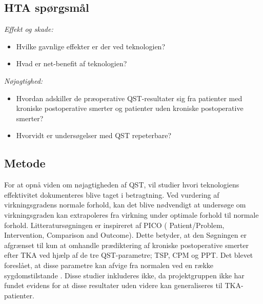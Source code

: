 \subsection{HTA spørgsmål}
\textit{Effekt og skade:}
\begin{itemize}
	\item Hvilke gavnlige effekter er der ved teknologien? %
	\item Hvad er net-benefit af teknologien? %
\end{itemize}
\textit{Nøjagtighed:}
\begin{itemize}
	\item Hvordan adskiller de præoperative QST-resultater sig fra patienter med kroniske postoperative smerter og patienter uden kroniske postoperative smerter? %
	\item Hvorvidt er undersøgelser med QST repeterbare? 
\end{itemize}
\subsection{Metode}
For at opnå viden om nøjagtigheden af QST, vil studier hvori teknologiens effektivitet dokumenteres blive taget i betragtning. Ved vurdering af virkningsgradens normale forhold, kan det blive nødvendigt at undersøge om virkningsgraden kan extrapoleres fra virkning under optimale forhold til normale forhold. Litteratursøgningen er inspireret  af PICO ( Patient/Problem, Intervention, Comparison and Outcome). Dette betyder, at den 
Søgningen er afgrænset til kun at omhandle prædiktering af kroniske postoperative smerter efter TKA ved hjælp af de tre QST-parametre; TSP, CPM og PPT. Det blevet foreslået, at disse parametre kan afvige fra normalen ved en række sygdomstilstande \citep{kristian2016}. Disse studier inkluderes ikke, da projektgruppen ikke har fundet evidens for at disse resultater uden videre kan generaliseres til TKA-patienter. 

